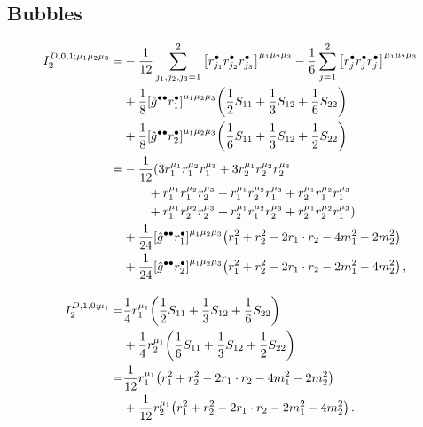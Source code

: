 \subsection*{Bubbles}
\begin{subequations}
\begin{align}
    I_2^{D,0,1;\mu_1\mu_2\mu_3} =& -\frac{1}{12}\sum_{j_1,j_2,j_3=1}^2\qty[r_{j_1}^\bullet r_{j_2}^\bullet r_{j_3}^\bullet]^{\mu_1\mu_2\mu_3} -\frac{1}{6}\sum_{j=1}^2\qty[r_j^\bullet r_j^\bullet r_j^\bullet]^{\mu_1\mu_2\mu_3}\notag\\
      &+\frac{1}{8}\qty[\hat{g}^{\bullet\bullet}r_1^\bullet]^{\mu_1\mu_2\mu_3}\qty(\frac{1}{2}S_{11}+\frac{1}{3}S_{12}+\frac{1}{6}S_{22})\notag\\
      &+\frac{1}{8}\qty[\hat{g}^{\bullet\bullet}r_2^\bullet]^{\mu_1\mu_2\mu_3}\qty(\frac{1}{6}S_{11}+\frac{1}{3}S_{12}+\frac{1}{2}S_{22})\notag\\
      =& -\frac{1}{12}(3r_1^{\mu_1}r_1^{\mu_2}r_1^{\mu_3}+3r_2^{\mu_1}r_2^{\mu_2}r_2^{\mu_3}\notag\\
      &\qquad+r_1^{\mu_1}r_1^{\mu_2}r_2^{\mu_3}+r_1^{\mu_1}r_2^{\mu_2}r_1^{\mu_3}+r_2^{\mu_1}r_1^{\mu_2}r_1^{\mu_3}\notag\\
      &\qquad+r_1^{\mu_1}r_2^{\mu_2}r_2^{\mu_3}+r_2^{\mu_1}r_1^{\mu_2}r_2^{\mu_3}+r_2^{\mu_1}r_2^{\mu_2}r_1^{\mu_3})\notag\\
      &+\frac{1}{24}\qty[\hat{g}^{\bullet\bullet}r_1^\bullet]^{\mu_1\mu_2\mu_3}\qty(r_1^2+r_2^2-2r_1\cdot r_2-4m_1^2-2m_2^2)\notag\\
      &+\frac{1}{24}\qty[\hat{g}^{\bullet\bullet}r_2^\bullet]^{\mu_1\mu_2\mu_3}\qty(r_1^2+r_2^2-2r_1\cdot r_2-2m_1^2-4m_2^2)\,,\\[10pt]
%
    I_2^{D,1,0;\mu_1} =& \frac{1}{4}r_1^{\mu_1}\qty(\frac{1}{2}S_{11}+\frac{1}{3}S_{12}+\frac{1}{6}S_{22})\notag\\
      &+\frac{1}{4}r_2^{\mu_1}\qty(\frac{1}{6}S_{11}+\frac{1}{3}S_{12}+\frac{1}{2}S_{22})\notag\\
      =& \frac{1}{12}r_1^{\mu_1}\qty(r_1^2+r_2^2-2r_1\cdot r_2-4m_1^2-2m_2^2)\notag\\
      &+\frac{1}{12}r_2^{\mu_1}\qty(r_1^2+r_2^2-2r_1\cdot r_2-2m_1^2-4m_2^2)\,.%
%
\end{align}
\end{subequations}

